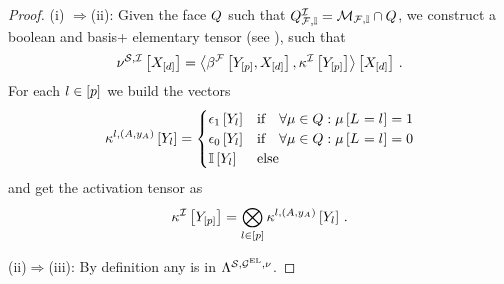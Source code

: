 \begin{proof}
(i)
    $\Rightarrow$(ii):
    Given the face $Q$ such that $Q^{\mathcal{I}}_{\mathcal{F},\mathbb{I}}=\mathcal{M}_{\mathcal{F},\mathbb{I}}\cap Q$, we construct a boolean and basis+ elementary tensor (see ), such that
    \begin{align*}
        \nu^{\mathcal{S},\mathcal{I}}\left[X_{[d]}\right]
        = \left\langle \beta^{\mathcal{F}}\left[Y_{[p]},X_{[d]}\right],\kappa^{\mathcal{I}}\left[Y_{[p]}\right]\right\rangle \left[ X_{[d]} \right] \, .
    \end{align*}
    For each $l\in[p]$ we build the vectors
    \begin{align*}
        \kappa^{l,(A,y_{A})}\left[Y_{l}\right]
        = \begin{cases}
              \epsilon_1\left[Y_{l}\right] & \text{if}\quad \forall{\mu\in Q}:{\mu\left[L_{}=l_{}\right]=1} \\
              \epsilon_0\left[Y_{l}\right] & \text{if}\quad \forall{\mu\in Q}:{\mu\left[L_{}=l_{}\right]=0} \\
              \mathbb{I}\left[Y_{l}\right] & \text{else}
        \end{cases}
    \end{align*}
    and get the activation tensor as
    \begin{align*}
        \kappa^{\mathcal{I}}\left[Y_{[p]}\right]
        = \bigotimes_{l\in[p]} \kappa^{l,(A,y_{A})}\left[Y_{l}\right] \, .
    \end{align*}

    (ii)$\Rightarrow$(iii):
    By definition any \HardLogicNetwork{} is in $\Lambda^{\mathcal{S},\mathcal{G}^{\mathrm{EL}},\nu}$.


\end{proof}
